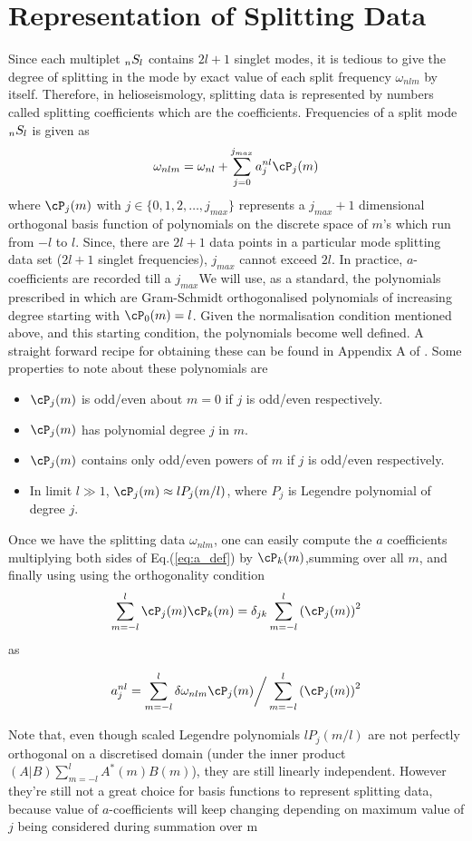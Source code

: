 \section{Representation of Splitting Data}
Since each multiplet $_{n}S_{l}$ contains $2l+1$ singlet modes, it is tedious to give the degree of splitting in the mode by exact value of each split frequency $\omega_{nlm}$ by itself. Therefore, in helioseismology, splitting data is represented by numbers called splitting coefficients which are the coefficients. Frequencies of a split mode $_{n}S_{l}$ is given as 
\begin{equation}
\omega_{nlm} = \omega_{nl} + \sum_{j=0}^{j_{max}} a^{nl}_j \cP_j(m)
\label{eq:a_def}
\end{equation}
where $\cP_{j}(m)$ with $j\in \{0,1,2,\ldots, j_{max}\}$ represents a $j_{max}+1$ dimensional orthogonal basis function of polynomials on the discrete space of $m$'s which run from $-l$ to $l$. Since, there are $2l+1$ data points in a particular mode splitting data set ($2l+1$ singlet frequencies), $j_{max}$ cannot exceed $2l$. In practice, $a$-coefficients are recorded till a $j_{max}$We will use, as a standard, the polynomials prescribed in \cite{ritzwoller} which are Gram-Schmidt orthogonalised polynomials of increasing degree starting with $\cP_0(m) = l$. Given the normalisation condition mentioned above, and this starting condition, the polynomials become well defined. A straight forward recipe for obtaining these can be found in Appendix A of \cite{schou_pol_94}. Some properties to note about these polynomials are
\begin{itemize}
\item $\cP_j(m)$ is odd/even about $m=0$ if $j$ is odd/even respectively.
\item $\cP_j(m)$ has polynomial degree $j$ in $m$.
\item $\cP_j(m)$ contains only odd/even powers of $m$ if $j$ is odd/even respectively.
\item In limit $l \gg 1$, $\cP_j(m) \approx lP_{j}(m/l)$, where $P_j$ is Legendre polynomial of degree $j$.
\end{itemize}

Once we have the splitting data $\omega_{nlm}$, one can easily compute the $a$ coefficients multiplying both sides of Eq.(\ref{eq:a_def}) by $\cP_k(m)$,summing over all $m$, and finally using using the orthogonality condition $$\sum_{m=-l}^l \cP_{j}(m) \cP_{k}(m) = \delta_{jk} \sum_{m=-l}^l \enc{\cP_{j}(m)}^2$$
as

\begin{equation}
a^{nl}_j = \sum_{m=-l}^l \delta\omega_{nlm}\cP_j(m) \bigg/ \sum_{m=-l}^l \enc{\cP_j(m)}^2
\end{equation}


Note that, even though scaled Legendre polynomials $lP_j(m/l)$ are not perfectly orthogonal on a discretised domain (under the inner product $(A|B)\sum_{m=-l}^l A^*(m)B(m)$), they are still linearly independent. However they're still not a great choice for basis functions to represent splitting data, because value of $a$-coefficients will keep changing depending on maximum value of $j$ being considered during summation over m